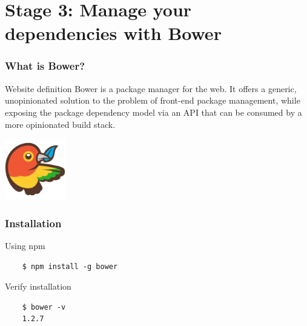 \section{Stage 3: Manage your dependencies with Bower}

\begin{frame}[fragile]
\end{frame}

\begin{frame}[fragile]
  \frametitle{What is Bower?}
  \begin{block}{Website definition}
    Bower is a package manager for the web. It offers a generic, unopinionated solution to the problem of front-end package management, while exposing the package dependency model via an API that can be consumed by a more opinionated build stack. 
  \end{block}

  \begin{center}
    \includegraphics[width=100px]{images/bower-logo.png}
  \end{center}
\end{frame}

\begin{frame}[fragile]
  \frametitle{Installation}

  \begin{block}{Using npm}
  {\scriptsize
    \begin{verbatim}
    $ npm install -g bower
    \end{verbatim}
  }
  \end{block}

  \pause

  \begin{block}{Verify installation}
  {\scriptsize
    \begin{verbatim}
    $ bower -v
    1.2.7
    \end{verbatim}
  }
  \end{block}
\end{frame}

